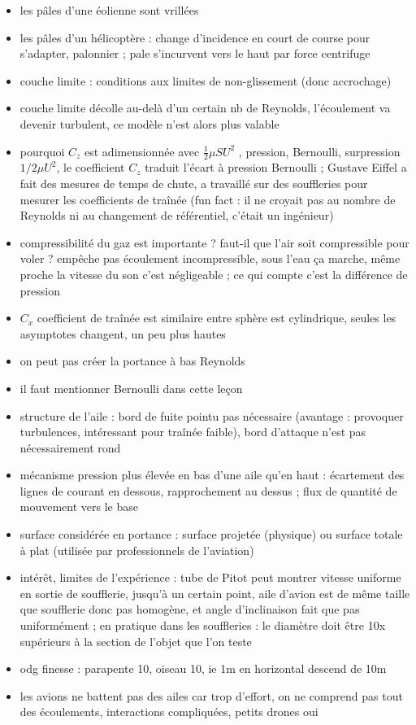 \begin{remarques} \begin{itemize} 
\item les pâles d'une éolienne sont vrillées
\item les pâles d'un hélicoptère : change d'incidence en court de course pour s'adapter, palonnier ; pale s'incurvent vers le haut par force centrifuge
\item couche limite : conditions aux limites de non-glissement (donc accrochage)
\item couche limite décolle au-delà d'un certain nb de Reynolds, l'écoulement va devenir turbulent, ce modèle n'est alors plus valable
\item pourquoi $C_z$ est adimensionnée avec $\frac{1}{2} \mu S U^2$ , pression, Bernoulli, surpression $1/2 \mu U^2$, le coefficient $C_z$ traduit l'écart à pression Bernoulli ; Gustave Eiffel a fait des mesures de temps de chute, a travaillé sur des souffleries pour mesurer les coefficients de traînée (fun fact : il ne croyait pas au nombre de Reynolds ni au changement de référentiel, c'était un ingénieur)
\item compressibilité du gaz est importante ? faut-il que l'air soit compressible pour voler ? empêche pas écoulement incompressible, sous l'eau ça marche, même proche la vitesse du son c'est négligeable ; ce qui compte c'est la différence de pression
\item $C_x$ coefficient de traînée est similaire entre sphère est cylindrique, seules les asymptotes changent, un peu plus hautes
\item on peut pas créer la portance à bas Reynolds 
\item il faut mentionner Bernoulli dans cette leçon
\item structure de l'aile : bord de fuite pointu pas nécessaire (avantage :  provoquer turbulences, intéressant pour traînée faible), bord d'attaque n'est pas nécessairement rond 
\item mécanisme pression plus élevée en bas d'une aile qu'en haut : écartement des lignes de courant en dessous, rapprochement au dessus ; flux de quantité de mouvement vers le base
\item surface considérée en portance : surface projetée (physique) ou surface totale à plat (utilisée par professionnels de l'aviation) 
\item intérêt, limites de l'expérience : tube de Pitot peut montrer vitesse uniforme en sortie de soufflerie, jusqu'à un certain point, aile d'avion est de même taille que soufflerie donc pas homogène, et angle d'inclinaison fait que pas uniformément ; en pratique dans les souffleries : le diamètre doit être 10x supérieurs à la section de l'objet que l'on teste
\item odg finesse : parapente 10, oiseau 10, ie 1m en horizontal descend de 10m
\item les avions ne battent pas des ailes car trop d'effort, on ne comprend pas tout des écoulements, interactions compliquées, petits drones oui
\end{itemize} \end{remarques}